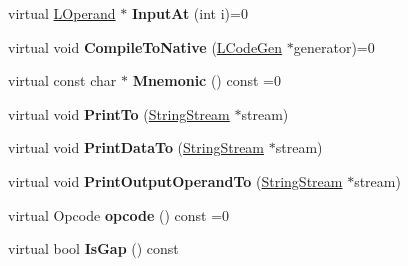 \begin{DoxyCompactItemize}
\item 
virtual \hyperlink{classv8_1_1internal_1_1_l_operand}{L\+Operand} $\ast$ {\bfseries Input\+At} (int i)=0\hypertarget{classv8_1_1internal_1_1_l_instruction_a65f5b87101a6f411d73e5ba9aa13a675}{}\label{classv8_1_1internal_1_1_l_instruction_a65f5b87101a6f411d73e5ba9aa13a675}

\item 
virtual void {\bfseries Compile\+To\+Native} (\hyperlink{classv8_1_1internal_1_1_l_code_gen}{L\+Code\+Gen} $\ast$generator)=0\hypertarget{classv8_1_1internal_1_1_l_instruction_acab3d83fd0de1d783ce5e5e8651009dd}{}\label{classv8_1_1internal_1_1_l_instruction_acab3d83fd0de1d783ce5e5e8651009dd}

\item 
virtual const char $\ast$ {\bfseries Mnemonic} () const  =0\hypertarget{classv8_1_1internal_1_1_l_instruction_ae256d0dcc2d6017d8c49d382254dccee}{}\label{classv8_1_1internal_1_1_l_instruction_ae256d0dcc2d6017d8c49d382254dccee}

\item 
virtual void {\bfseries Print\+To} (\hyperlink{classv8_1_1internal_1_1_string_stream}{String\+Stream} $\ast$stream)\hypertarget{classv8_1_1internal_1_1_l_instruction_a7fd3ca39e41f221d7dd97c947219770c}{}\label{classv8_1_1internal_1_1_l_instruction_a7fd3ca39e41f221d7dd97c947219770c}

\item 
virtual void {\bfseries Print\+Data\+To} (\hyperlink{classv8_1_1internal_1_1_string_stream}{String\+Stream} $\ast$stream)\hypertarget{classv8_1_1internal_1_1_l_instruction_a3e3375f04ff4ab46cd75200cfa1b918d}{}\label{classv8_1_1internal_1_1_l_instruction_a3e3375f04ff4ab46cd75200cfa1b918d}

\item 
virtual void {\bfseries Print\+Output\+Operand\+To} (\hyperlink{classv8_1_1internal_1_1_string_stream}{String\+Stream} $\ast$stream)\hypertarget{classv8_1_1internal_1_1_l_instruction_af5f97137ae7c1b7af3737b41c235f28f}{}\label{classv8_1_1internal_1_1_l_instruction_af5f97137ae7c1b7af3737b41c235f28f}

\item 
virtual Opcode {\bfseries opcode} () const  =0\hypertarget{classv8_1_1internal_1_1_l_instruction_aa0129e8a782b2dd3d9753986e3d245f1}{}\label{classv8_1_1internal_1_1_l_instruction_aa0129e8a782b2dd3d9753986e3d245f1}

\item 
virtual bool {\bfseries Is\+Gap} () const \hypertarget{classv8_1_1internal_1_1_l_instruction_a96115165585397545ac4945072c27dfc}{}\label{classv8_1_1internal_1_1_l_instruction_a96115165585397545ac4945072c27dfc}


\end{DoxyCompactItemize}
